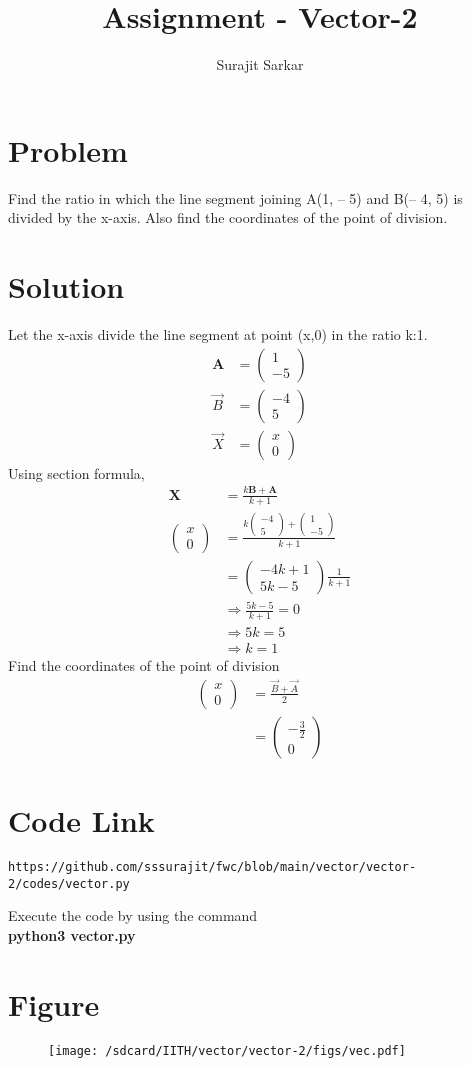 \documentclass[journal,12pt,twocolumn]{IEEEtran}
\title{\mytitle}
\title{
Assignment - Vector-2
}
\author{Surajit Sarkar}
\newcommand{\myvec}[1]{\ensuremath{\begin{pmatrix}#1\end{pmatrix}}}
\let\vec\mathbf
\begin{document}
\maketitle
\tableofcontents
\bigskip
\section{\textbf{Problem}}
Find the ratio in which the line segment joining A(1, – 5) and B(– 4, 5) is divided by the
x-axis. Also find the coordinates of the point of division.
\section{\textbf{Solution}}
Let the x-axis divide the line segment at point (x,0) in the ratio k:1.
\begin{align}
\vec{A}&=\myvec{1 \\ -5} \\ 
\Vec{B}&=\myvec{-4 \\ 5} \\ 
\Vec{X}&=\myvec{x\\0}
\end{align}
Using section formula,
\begin{align}
\vec{X}&=\frac{k\vec{B}+\vec{A}}{k+1}\\
\myvec{x\\0}&=\frac{k\myvec{-4\\5}+\myvec{1\\-5}}{k+1}\\
&=\myvec{-4k+1\\5k-5}\frac{1}{k+1}\\
&\Rightarrow \frac{5k-5}{k+1}=0\\
&\Rightarrow 5k=5\\
&\Rightarrow k=1
\end{align}
Find the coordinates of the point of division
\begin{align}
    \myvec{x\\0}&=\frac{\Vec{B}+\Vec{A}}{2}\\
    &=\myvec{-\frac{3}{2}\\0}
\end{align}
\section{\textbf{Code Link}}
\begin{lstlisting}
https://github.com/sssurajit/fwc/blob/main/vector/vector-2/codes/vector.py
\end{lstlisting}
Execute the code by using the command\\
\textbf{python3 vector.py}
\section{\textbf{Figure}}
\begin{figure}[!h]
\centering
\texttt{[image: /sdcard/IITH/vector/vector-2/figs/vec.pdf]}
\caption{}
\label{fig:vec}
\end{figure}
\end{document}
